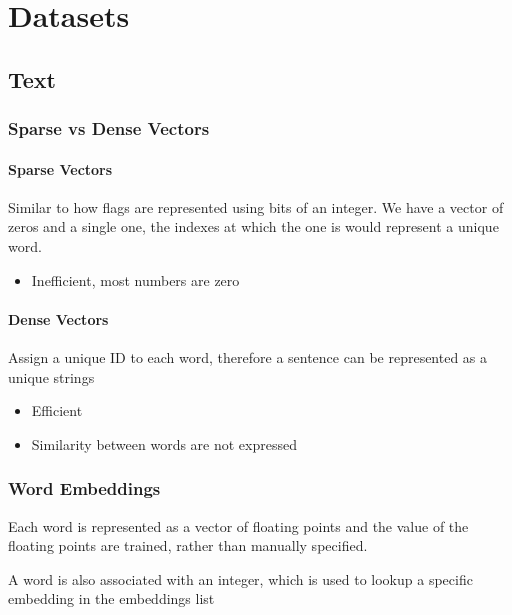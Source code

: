 \section{Datasets}

  \subsection{Text}

    \subsubsection{Sparse vs Dense Vectors}

      \paragraph{Sparse Vectors} Similar to how flags are represented using
      bits of an integer. We have a vector of zeros and a single one,
      the indexes at which the one is would represent a unique word.
      \begin{itemize}
        \item Inefficient, most numbers are zero
      \end{itemize}

      \paragraph{Dense Vectors} Assign a unique ID to each word, therefore
      a sentence can be represented as a unique strings
      \begin{itemize}
        \item Efficient
        \item Similarity between words are not expressed
      \end{itemize}

    \subsubsection{Word Embeddings}

      Each word is represented as a vector of floating points and the value
      of the floating points are trained, rather than manually specified.

      A word is also associated with an integer, which is used to lookup
      a specific embedding in the embeddings list